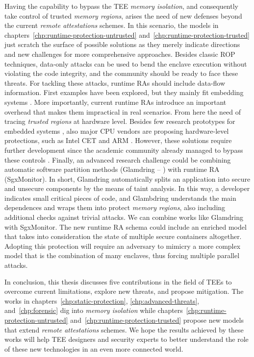 Having the capability to bypass the TEE \emph{memory isolation}, and 
consequently take control of trusted  \emph{memory regions}, arises the need 
of new defenses beyond the current \emph{remote attestations} schemes.
In this scenario, the models in chapters~\ref{chp:runtime-protection-untrusted} 
and~\ref{chp:runtime-protection-trusted} just scratch the surface of 
possible solutions as they merely indicate directions and new challenges for 
more comprehensive approaches.
Besides classic ROP techniques, data-only attacks can be used to bend the 
enclave execution without violating the code integrity, and the community 
should be ready to face these threats.
For tackling these attacks, runtime RAs should include data-flow information.
First examples have been explored, but they mainly fit embedding systems 
\citep{sun2020oat,aberadiat}.
More importantly, current runtime RAs introduce an important overhead 
that makes them impractical in real scenarios.
From here the need of tracing \emph{trusted regions} at hardware level.
Besides few research prototypes for embedded systems 
\citep{Dessouky:2018:LLH:3240765.3240821}, also major CPU vendors are proposing 
hardware-level protections, such as Intel CET \citep{intelcet} and ARM 
\citep{armpa}.
However, these solutions require further development since the academic 
community already managed to bypass these controls \citep{van2012memory}.
Finally, an advanced research challenge could be combining 
automatic software partition methods (\eg Glamdring -- 
\cite{lind2017glamdring}) with runtime RA (\eg SgxMonitor).
In short, Glamdring automatically splits an application into secure and 
unsecure components by the means of taint analysis. In this way, a developer 
indicates small critical pieces of code, and Glambdring understands the main 
dependences and wraps them into protect \emph{memory regions}, also including 
additional checks against trivial attacks. 
We can combine works like Glamdring with SgxMonitor. The new runtime RA schema 
could include an enriched model that takes into consideration the state of 
multiple secure containers altogether. Adopting this protection will require an 
adversary to mimicry a more complex model that is the combination of many 
enclaves, thus forcing multiple parallel attacks.

In conclusion, this thesis discusses five contributions in the field of TEEs to 
overcome current limitations, explore new threats, and propose mitigation.
The works in chapters~\ref{chp:static-protection}, \ref{chp:advanced-threats}, 
and~\ref{chp:forensic} dig into \emph{memory isolation} while 
chapters~\ref{chp:runtime-protection-untrusted} 
and~\ref{chp:runtime-protection-trusted} propose new models that extend 
\emph{remote attestations} schemes.
We hope the results achieved by these works will help TEE designers and 
security experts to better understand the role of these new technologies in 
an even more connected world.


